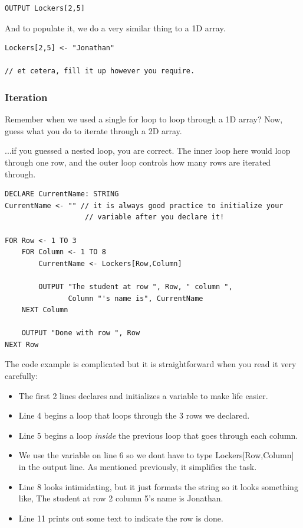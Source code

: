 \documentclass[./main.tex]{subfiles}
\begin{document}
\begin{verbatim}
OUTPUT Lockers[2,5]
\end{verbatim}

And to populate it, we do a very similar thing to a 1D array.

\begin{verbatim}
Lockers[2,5] <- "Jonathan"

// et cetera, fill it up however you require.
\end{verbatim}

\subsubsection{Iteration}

Remember when we used a single for loop to loop through a 1D array? Now, guess what you do to iterate through a 2D array.

...if you guessed a nested loop, you are correct. The inner loop here would loop through one row, and the outer loop controls how many rows are iterated through.

\begin{verbatim}
DECLARE CurrentName: STRING
CurrentName <- "" // it is always good practice to initialize your
                   // variable after you declare it!

FOR Row <- 1 TO 3
    FOR Column <- 1 TO 8
        CurrentName <- Lockers[Row,Column]

        OUTPUT "The student at row ", Row, " column ",
               Column "'s name is", CurrentName
    NEXT Column

    OUTPUT "Done with row ", Row
NEXT Row
\end{verbatim}

The code example is complicated but it is straightforward when you read it very carefully:

\begin{itemize}
    \item The first 2 lines declares and initializes a variable to make life easier.
    \item Line 4 begins a loop that loops through the 3 rows we declared.
    \item Line 5 begins a loop \emph{inside} the previous loop that goes through each column.
    \item We use the variable on line 6 so we dont have to type {\ccmono Lockers[Row,Column]} in the output line. As mentioned previously, it simplifies the task.
    \item Line 8 looks intimidating, but it just formats the string so it looks something like, {\ccmono The student at row 2 column 5's name is Jonathan}.
    \item Line 11 prints out some text to indicate the row is done.
\end{itemize}
\end{document}

